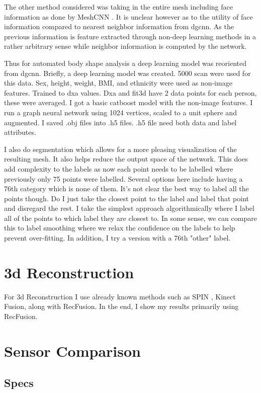 The other method considered was taking in the entire mesh including face information as done by MeshCNN \cite{hanocka2019meshcnn}. It is unclear however as to the utility of face information compared to nearest neighbor information from dgcnn. As the previous information is feature extracted through non-deep learning methods in a rather arbitrary sense while neighbor information is computed by the network.

Thus for automated body shape analysis a deep learning model was reoriented from dgcnn. Briefly, a deep learning model was created. 5000 scan were used for this data. Sex, height, weight, BMI, and ethnicity were used as non-image features. Trained to dxa values. Dxa and fit3d have 2 data points for each person, these were averaged. I got a basic catboost model with the non-image features. I run a graph neural network using 1024 vertices, scaled to a unit sphere and augmented. I saved .obj files into .h5 files. .h5 file need both data and label attributes. 

I also do segmentation which allows for a more pleasing visualization of the resulting mesh. It also helps reduce the output space of the network. This does add complexity to the labels as now each point needs to be labelled where previously only 75 points were labelled. Several options here include having a 76th category which is none of them. It's not clear the best way to label all the points though. Do I just take the closest point to the label and label that point and disregard the rest. I take the simplest approach algorithmically where I label all of the points to which label they are closest to. In some sense, we can compare this to label smoothing where we relax the confidence on the labels to help prevent over-fitting. In addition, I try a version with a 76th "other" label.

\section{3d Reconstruction}
For 3d Reconstruction I use already known methods such as SPIN \cite{kolotouros2019learning} , Kinect Fusion, along with RecFusion. In the end, I show my results primarily using RecFusion.
\section{Sensor Comparison}

\subsection{Specs}

